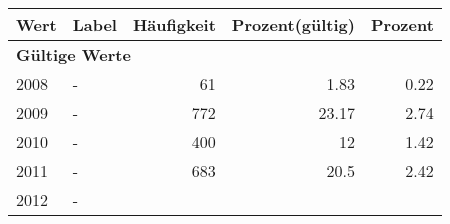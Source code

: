      \begin{longtable}{lXrrr}
     \toprule
     \textbf{Wert} & \textbf{Label} & \textbf{Häufigkeit} & \textbf{Prozent(gültig)} & \textbf{Prozent} \\
     \endhead
     \midrule
     \multicolumn{5}{l}{\textbf{Gültige Werte}}\\

     2008 &
     \multicolumn{1}{X}{ -  } &


       \num{61} &
       \num[round-mode=places,round-precision=2]{1.83} &
         \num[round-mode=places,round-precision=2]{0.22} \\

     2009 &
     \multicolumn{1}{X}{ -  } &


       \num{772} &
       \num[round-mode=places,round-precision=2]{23.17} &
         \num[round-mode=places,round-precision=2]{2.74} \\

     2010 &
     \multicolumn{1}{X}{ -  } &


       \num{400} &
       \num[round-mode=places,round-precision=2]{12} &
         \num[round-mode=places,round-precision=2]{1.42} \\

     2011 &
     \multicolumn{1}{X}{ -  } &


       \num{683} &
       \num[round-mode=places,round-precision=2]{20.5} &
         \num[round-mode=places,round-precision=2]{2.42} \\

     2012 &
     \multicolumn{1}{X}{ -  } &



\end{longtable}
